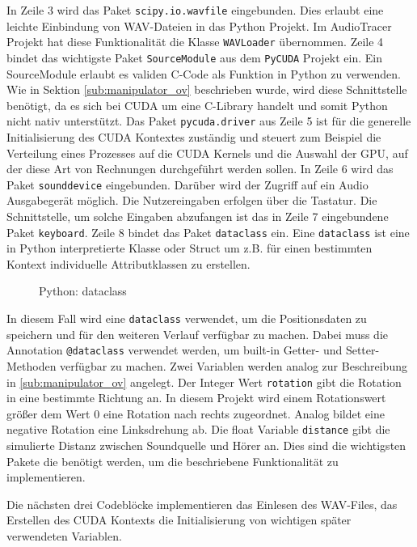 In Zeile 3 wird das Paket \texttt{scipy.io.wavfile} eingebunden. Dies erlaubt eine leichte Einbindung von WAV-Dateien in das Python Projekt. Im AudioTracer Projekt hat diese Funktionalität die Klasse \texttt{WAVLoader} übernommen. Zeile 4 bindet das wichtigste Paket \texttt{SourceModule} aus dem \texttt{PyCUDA} Projekt ein. Ein SourceModule erlaubt es validen C-Code als Funktion in Python zu verwenden. Wie in Sektion \ref{sub:manipulator_ov} beschrieben wurde, wird diese Schnittstelle benötigt, da es sich bei CUDA um eine C-Library handelt und somit Python nicht nativ unterstützt. Das Paket \texttt{pycuda.driver} aus Zeile 5 ist für die generelle Initialisierung des CUDA Kontextes zuständig und steuert zum Beispiel die Verteilung eines Prozesses auf die CUDA Kernels und die Auswahl der GPU, auf der diese Art von Rechnungen durchgeführt werden sollen. In Zeile 6 wird das Paket \texttt{sounddevice} eingebunden. Darüber wird der Zugriff auf ein Audio Ausgabegerät möglich. Die Nutzereingaben erfolgen über die Tastatur. Die Schnittstelle, um solche Eingaben abzufangen ist das in Zeile 7 eingebundene Paket \texttt{keyboard}. Zeile 8 bindet das Paket \texttt{dataclass} ein. Eine \texttt{dataclass} ist eine in Python interpretierte Klasse oder Struct um z.B. für einen bestimmten Kontext individuelle Attributklassen zu erstellen. 

\begin{figure}[h!]
	
	\caption{Python: dataclass}
	\label{fig:audioparkour_dataclass}
\end{figure}

In diesem Fall wird eine \texttt{dataclass} verwendet, um die Positionsdaten zu speichern und für den weiteren Verlauf verfügbar zu machen. Dabei muss die Annotation \texttt{@dataclass} verwendet werden, um built-in Getter- und Setter-Methoden verfügbar zu machen. Zwei Variablen werden analog zur Beschreibung in \ref{sub:manipulator_ov} angelegt. Der Integer Wert \texttt{rotation} gibt die Rotation in eine bestimmte Richtung an. In diesem Projekt wird einem Rotationswert größer dem Wert 0 eine Rotation nach rechts zugeordnet. Analog bildet eine negative Rotation eine Linksdrehung ab. Die float Variable \texttt{distance} gibt die simulierte Distanz zwischen Soundquelle und Hörer an. 
Dies sind die wichtigsten Pakete die benötigt werden, um die beschriebene Funktionalität zu implementieren.

Die nächsten drei Codeblöcke implementieren das Einlesen des WAV-Files, das Erstellen des CUDA Kontexts die Initialisierung von wichtigen später verwendeten Variablen.

